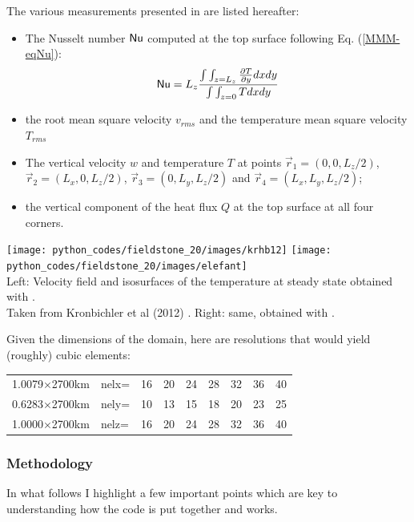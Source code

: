 The various measurements presented in \cite{bucc94} are listed hereafter:
\begin{itemize}
\item The Nusselt number ${\mathsf{Nu}}$ computed at the top surface following Eq. (\ref{MMM-eqNu}):
\[
{\mathsf{Nu}} = L_z \frac{\int\int_{z=L_z} \frac{\partial T}{\partial y} dx dy  }{\int \int_{z=0} T dx dy}
\]
\item the root mean square velocity $v_{rms}$ and the temperature mean square velocity $T_{rms}$
\item The vertical velocity $w$ and temperature $T$ at points $\vec{r}_1=(0,0,L_z/2)$, 
$\vec{r}_2=(L_x,0,L_z/2)$,
$\vec{r}_3=(0,L_y,L_z/2)$ and $\vec{r}_4=(L_x,L_y,L_z/2)$;
\item the vertical component of the heat flux $Q$ at the top surface  at all four corners. 
\end{itemize}

\begin{center}
\texttt{[image: python\_codes/fieldstone\_20/images/krhb12]}
\texttt{[image: python\_codes/fieldstone\_20/images/elefant]}\\
{\captionfont Left: 
Velocity field and isosurfaces of the temperature at steady state obtained 
with \aspect.\\ Taken from Kronbichler et al (2012) \cite{krhb12}.
Right: same, obtained with \elefant \cite{thie14}.}
\end{center}


\noindent Given the dimensions of the domain, here are resolutions that would yield (roughly) cubic elements:
\begin{center}
\begin{tabular}{l|lccccccc|}
1.0079$\times$2700km&nelx= &16 &20 &24 &28 &32 &36 &40 \\  
0.6283$\times$2700km&nely= &10 &13 &15 &18 &20 &23 &25 \\
1.0000$\times$2700km&nelz= &16 &20 &24 &28 &32 &36 &40 \\  
\end{tabular}
\end{center}

\subsubsection*{Methodology}

In what follows I highlight a few important points which are key to understanding how the code
is put together and works. 

